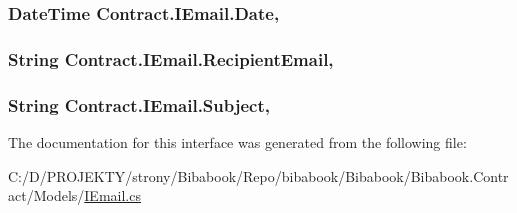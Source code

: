 \subsubsection[{Date}]{\setlength{\rightskip}{0pt plus 5cm}Date\+Time Contract.\+I\+Email.\+Date\hspace{0.3cm}{\ttfamily [get]}, {\ttfamily [set]}}\label{interface_contract_1_1_i_email_a92e856e464f5d3c3709bcbc6b2354152}
\hypertarget{interface_contract_1_1_i_email_a31073bab248d85973d9e36ce4475a636}{}
\subsubsection[{Recipient\+Email}]{\setlength{\rightskip}{0pt plus 5cm}String Contract.\+I\+Email.\+Recipient\+Email\hspace{0.3cm}{\ttfamily [get]}, {\ttfamily [set]}}\label{interface_contract_1_1_i_email_a31073bab248d85973d9e36ce4475a636}
\hypertarget{interface_contract_1_1_i_email_a5defb28657fa6e8aa53ba01ff87d62f3}{}
\subsubsection[{Subject}]{\setlength{\rightskip}{0pt plus 5cm}String Contract.\+I\+Email.\+Subject\hspace{0.3cm}{\ttfamily [get]}, {\ttfamily [set]}}\label{interface_contract_1_1_i_email_a5defb28657fa6e8aa53ba01ff87d62f3}


The documentation for this interface was generated from the following file\+:\begin{DoxyCompactItemize}
\item 
C\+:/\+D/\+P\+R\+O\+J\+E\+K\+T\+Y/strony/\+Bibabook/\+Repo/bibabook/\+Bibabook/\+Bibabook.\+Contract/\+Models/\hyperlink{_i_email_8cs}{I\+Email.\+cs}\end{DoxyCompactItemize}
